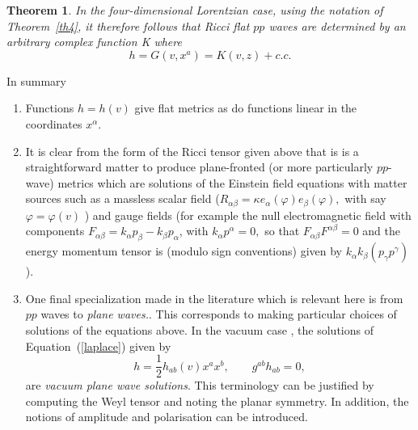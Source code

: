 \documentclass[12pt,a4paper]{article}
\newcounter{theorem}
\newtheorem{theorem}{Theorem}[section]   %
\newcounter{eg}
\def\p{\partial}
\begin{document}
\begin{theorem} 

In the four-dimensional Lorentzian case, using the notation of
Theorem~\ref{th4}, it therefore follows that {\em Ricci flat $pp$ waves} are
determined by an arbitrary complex function K where
\begin{equation}
h = G(v,x^{a}) = K(v,z) + c.c.
\end{equation}

\end{theorem}


In summary

\begin{enumerate}

\item Functions $h=h(v)$ give flat metrics as do functions linear in the
coordinates $x^{\alpha}$.

\item It is clear from the form of the Ricci tensor given above that
  is is a straightforward matter to produce plane-fronted (or more
  particularly $pp$-wave) metrics which are solutions of the Einstein
  field equations with matter sources such as a massless scalar field
  ($R_{\alpha\beta}=\kappa e_{\alpha}(\varphi )e_{\beta}(\varphi),$
  with say $\varphi=\varphi(v)$ ) and gauge fields (for example the
  null electromagnetic field with components
  $F_{\alpha\beta}=k_{\alpha} p_{\beta}-k_{\beta}p_{\alpha}$, with
  $k_{\alpha}p^{\alpha}=0,$ so that $F_{\alpha\beta}F^{\alpha\beta}=0$
  and the energy momentum tensor is (modulo sign conventions) given by
  $k_{\alpha}k_{\beta} (p_{\gamma}p^{\gamma})$).
  
\item One final specialization made in the literature which is
  relevant here is from $pp$ waves to {\it plane waves.}. This
  corresponds to making particular choices of solutions of the
  equations above. In the vacuum case , the solutions of
  Equation~(\ref{laplace}) given by
\begin{equation}
h = \frac 12 h_{ab}(v)x^{a}x^{b}, \qquad g^{ab} h_{ab} = 0, \label{vpws}
\end{equation}
are {\it vacuum plane wave solutions}. This terminology can be
justified by computing the Weyl tensor and noting the planar symmetry.
In addition, the notions of amplitude and polarisation can be
introduced.

\end{enumerate}
\end{document}

